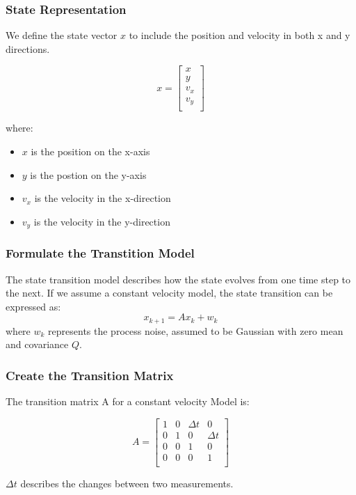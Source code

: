 \documentclass[aspectratio=169]{beamer}
\begin{document}
\begin{frame}
    \frametitle{State Representation}
    We define the state vector \(x\) to include the position and velocity in both x and y directions.

    \begin{equation*}
        x = \begin{bmatrix}
            x     \\
            y     \\
            v_{x} \\
            v_{y} \\
        \end{bmatrix}
    \end{equation*}

    where:
    \begin{itemize}
        \item \(x\) is the position on the x-axis
        \item \(y\) is the postion on the y-axis
        \item \(v_{x}\) is the velocity in the x-direction
        \item \(v_{y}\) is the velocity in the y-direction

    \end{itemize}
\end{frame}

\begin{frame}
    \frametitle{Formulate the Transtition Model}
    The state transition model describes how the state evolves from one time step to the next.
    If we assume a constant velocity model, the state transition can be expressed as:
    \begin{equation*}
        x_{k+1}=Ax_{k}+w_{k}
    \end{equation*}
    where \(w_{k}\) represents the process noise, assumed to be Gaussian with zero mean and covariance \(Q\).
\end{frame}

\begin{frame}
    \frametitle{Create the Transition Matrix}
    The transition matrix A for a constant velocity Model is:

    \begin{equation*}
        A = \begin{bmatrix}
            1 & 0 & \Delta t & 0        \\
            0 & 1 & 0        & \Delta t \\
            0 & 0 & 1        & 0        \\
            0 & 0 & 0        & 1        \\
        \end{bmatrix}
    \end{equation*}

    \(\Delta t\) describes the changes between two measurements.
\end{frame}
\end{document}
